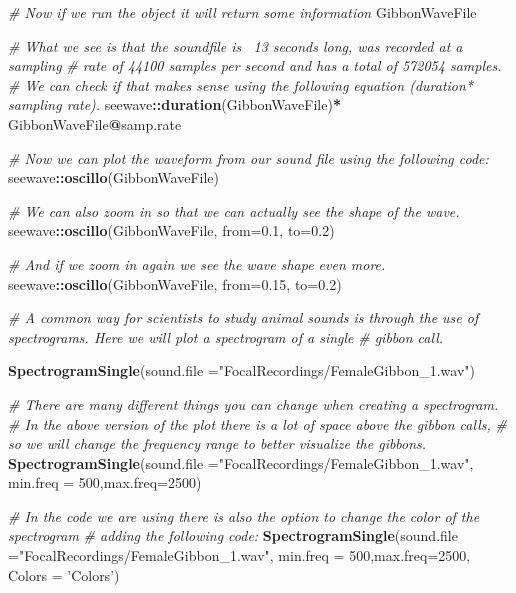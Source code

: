 \documentclass[]{book}
\newenvironment{Shaded}{\begin{snugshade}}{\end{snugshade}}
\newcommand{\CommentTok}[1]{\textcolor[rgb]{0.56,0.35,0.01}{\textit{#1}}}
\newcommand{\DataTypeTok}[1]{\textcolor[rgb]{0.13,0.29,0.53}{#1}}
\newcommand{\DecValTok}[1]{\textcolor[rgb]{0.00,0.00,0.81}{#1}}
\newcommand{\FloatTok}[1]{\textcolor[rgb]{0.00,0.00,0.81}{#1}}
\newcommand{\KeywordTok}[1]{\textcolor[rgb]{0.13,0.29,0.53}{\textbf{#1}}}
\newcommand{\NormalTok}[1]{#1}
\newcommand{\OperatorTok}[1]{\textcolor[rgb]{0.81,0.36,0.00}{\textbf{#1}}}
\newcommand{\StringTok}[1]{\textcolor[rgb]{0.31,0.60,0.02}{#1}}
\begin{document}
\begin{Shaded}
\begin{Highlighting}[]
\CommentTok{# Now if we run the object it will return some information}
\NormalTok{GibbonWaveFile}

\CommentTok{# What we see is that the soundfile is ~13 seconds long, was recorded at a sampling}
\CommentTok{# rate of 44100 samples per second and has a total of 572054 samples.}
\CommentTok{# We can check if that makes sense using the following equation (duration* sampling rate).}
\NormalTok{seewave}\OperatorTok{::}\KeywordTok{duration}\NormalTok{(GibbonWaveFile)}\OperatorTok{*}\StringTok{ }\NormalTok{GibbonWaveFile}\OperatorTok{@}\NormalTok{samp.rate}

\CommentTok{# Now we can plot the waveform from our sound file using the following code:}
\NormalTok{seewave}\OperatorTok{::}\KeywordTok{oscillo}\NormalTok{(GibbonWaveFile)}


\CommentTok{# We can also zoom in so that we can actually see the shape of the wave. }
\NormalTok{seewave}\OperatorTok{::}\KeywordTok{oscillo}\NormalTok{(GibbonWaveFile, }\DataTypeTok{from=}\FloatTok{0.1}\NormalTok{, }\DataTypeTok{to=}\FloatTok{0.2}\NormalTok{)}

\CommentTok{# And if we zoom in again we see the wave shape even more. }
\NormalTok{seewave}\OperatorTok{::}\KeywordTok{oscillo}\NormalTok{(GibbonWaveFile, }\DataTypeTok{from=}\FloatTok{0.15}\NormalTok{, }\DataTypeTok{to=}\FloatTok{0.2}\NormalTok{)}

\CommentTok{# A common way for scientists to study animal sounds is through the use of spectrograms. Here we will plot a spectrogram of a single}
\CommentTok{# gibbon call.}

\KeywordTok{SpectrogramSingle}\NormalTok{(}\DataTypeTok{sound.file =}\StringTok{"FocalRecordings/FemaleGibbon_1.wav"}\NormalTok{)}

\CommentTok{# There are many different things you can change when creating a spectrogram.}
\CommentTok{# In the above version of the plot there is a lot of space above the gibbon calls, }
\CommentTok{# so we will change the frequency range to better visualize the gibbons.}
\KeywordTok{SpectrogramSingle}\NormalTok{(}\DataTypeTok{sound.file =}\StringTok{"FocalRecordings/FemaleGibbon_1.wav"}\NormalTok{,}
                  \DataTypeTok{min.freq =} \DecValTok{500}\NormalTok{,}\DataTypeTok{max.freq=}\DecValTok{2500}\NormalTok{)}

\CommentTok{# In the code we are using there is also the option to change the color of the spectrogram}
\CommentTok{# adding the following code:}
\KeywordTok{SpectrogramSingle}\NormalTok{(}\DataTypeTok{sound.file =}\StringTok{"FocalRecordings/FemaleGibbon_1.wav"}\NormalTok{,}
                  \DataTypeTok{min.freq =} \DecValTok{500}\NormalTok{,}\DataTypeTok{max.freq=}\DecValTok{2500}\NormalTok{,}
                  \DataTypeTok{Colors =} \StringTok{'Colors'}\NormalTok{)}


\end{Highlighting}
\end{Shaded}
\end{document}
